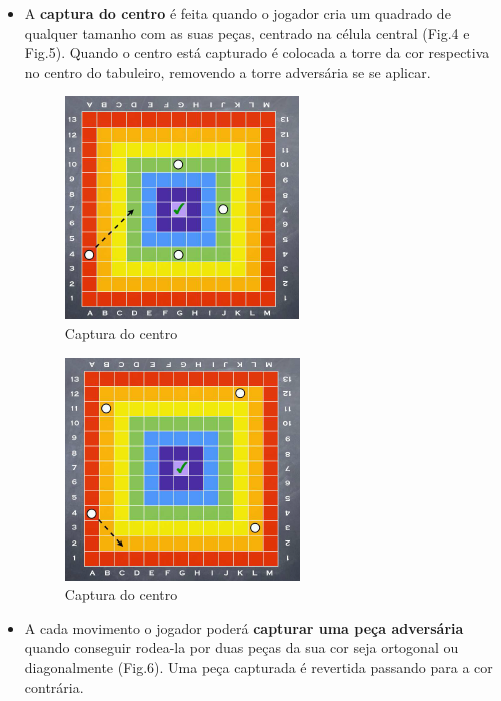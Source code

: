 \documentclass[a4paper]{article}
\begin{document}
\begin{itemize}
\newpage
\item A \textbf{captura do centro} é feita quando o jogador cria um quadrado de qualquer tamanho com as suas peças, centrado na célula central (Fig.4 e Fig.5). Quando o centro está capturado é colocada a torre da cor respectiva no centro do tabuleiro, removendo a torre adversária se se aplicar.


\begin{figure}[h!]
\begin{center}
\includegraphics[scale=0.9]{fig4.png}
\caption{Captura do centro}
\end{center}
\end{figure}

\begin{figure}[h!]
\begin{center}
\includegraphics[scale=0.9]{fig41.png}
\caption{Captura do centro}
\end{center}
\end{figure}

\newpage
\item A cada movimento o jogador poderá \textbf{capturar uma peça adversária} quando conseguir rodea-la por duas peças da sua cor seja ortogonal ou diagonalmente (Fig.6). Uma peça capturada é revertida passando para a cor contrária. 


\end{itemize}
\end{document}
